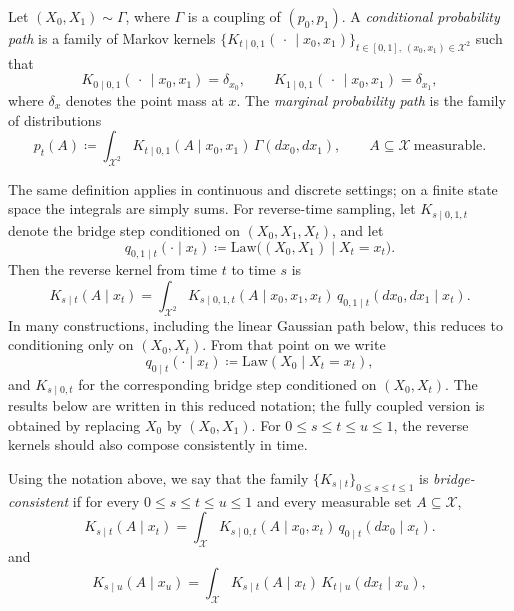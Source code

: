 \begin{definition}
\label{def:conditional-marginal-probability-path}
Let \((X_0,X_1)\sim \Gamma\), where \(\Gamma\) is a coupling of \((p_0,p_1)\).
A \emph{conditional probability path} is a family of Markov kernels \(\{K_{t\mid 0,1}(\,\cdot\,\mid x_0,x_1)\}_{t\in[0,1],\,(x_0,x_1)\in\mathcal{X}^2}\) such that
\[
  K_{0\mid 0,1}(\,\cdot\,\mid x_0,x_1)=\delta_{x_0},
  \qquad
  K_{1\mid 0,1}(\,\cdot\,\mid x_0,x_1)=\delta_{x_1},
\]
where \(\delta_{x}\) denotes the point mass at \(x\).
The \emph{marginal probability path} is the family of distributions
\begin{equation}
  p_t(A) \coloneqq \int_{\mathcal{X}^2} K_{t\mid 0,1}(A\mid x_0,x_1)\,\Gamma(dx_0,dx_1),
  \qquad A\subseteq\mathcal{X}\ \text{measurable}.
  \label{eq:marginal-path-general}
\end{equation}
\end{definition}

The same definition applies in continuous and discrete settings; on a finite state space the integrals are simply sums.
For reverse-time sampling, let \(K_{s\mid 0,1,t}\) denote the bridge step conditioned on \((X_0,X_1,X_t)\), and let
\[
  q_{0,1\mid t}(\cdot\mid x_t)\coloneqq \mathrm{Law}\bigl((X_0,X_1)\mid X_t=x_t\bigr).
\]
Then the reverse kernel from time \(t\) to time \(s\) is
\[
  K_{s\mid t}(A\mid x_t)
  =
  \int_{\mathcal{X}^2} K_{s\mid 0,1,t}(A\mid x_0,x_1,x_t)\,q_{0,1\mid t}(dx_0,dx_1\mid x_t).
\]
In many constructions, including the linear Gaussian path below, this reduces to conditioning only on \((X_0,X_t)\).
From that point on we write
\[
  q_{0\mid t}(\cdot\mid x_t)\coloneqq \mathrm{Law}(X_0\mid X_t=x_t),
\]
and \(K_{s\mid 0,t}\) for the corresponding bridge step conditioned on \((X_0,X_t)\).
The results below are written in this reduced notation; the fully coupled version is obtained by replacing \(X_0\) by \((X_0,X_1)\).
For \(0\le s\le t\le u\le 1\), the reverse kernels should also compose consistently in time.

\begin{definition}
\label{def:bridge-consistent-reverse-kernels}
Using the notation above, we say that the family \(\{K_{s\mid t}\}_{0\le s\le t\le 1}\) is \emph{bridge-consistent} if for every \(0\le s\le t\le u\le 1\) and every measurable set \(A\subseteq\mathcal{X}\),
\begin{equation}
  K_{s\mid t}(A\mid x_t)
  =
  \int_{\mathcal{X}} K_{s\mid 0,t}(A\mid x_0,x_t)\,q_{0\mid t}(dx_0\mid x_t).
  \label{eq:bridge-consistency-posterior}
\end{equation}
and
\begin{equation}
  K_{s\mid u}(A\mid x_u)
  =
  \int_{\mathcal{X}} K_{s\mid t}(A\mid x_t)\,K_{t\mid u}(dx_t\mid x_u),
  \label{eq:bridge-consistency-ck}
\end{equation}
\end{definition}

